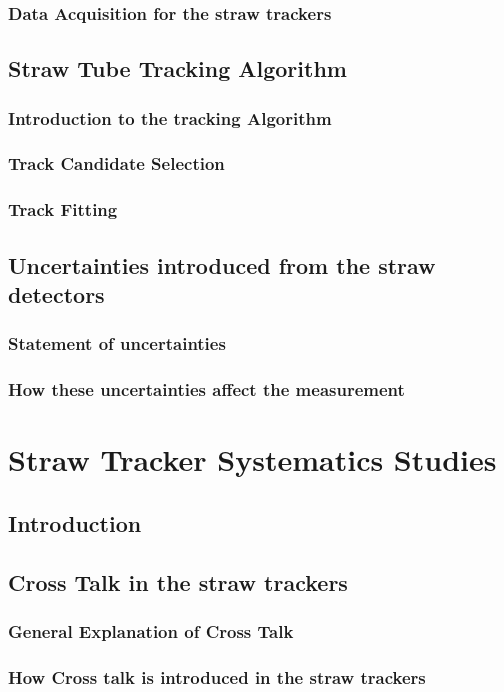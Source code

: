 \documentclass[11pt, oneside]{article}   	%
\begin{document}
		\subsubsection{Data Acquisition for the straw trackers}
	\subsection{Straw Tube Tracking Algorithm}
		\subsubsection{Introduction to the tracking Algorithm}
		\subsubsection{Track Candidate Selection}
		\subsubsection{Track Fitting}
	\subsection{Uncertainties introduced from the straw detectors}
		\subsubsection{Statement of uncertainties}
		\subsubsection{How these uncertainties affect the measurement}

\newpage
	
\section{Straw Tracker Systematics Studies}
	\subsection{Introduction}
	\subsection{Cross Talk in the straw trackers}
		\subsubsection{General Explanation of Cross Talk}
		\subsubsection{How Cross talk is introduced in the straw trackers}
\end{document}
